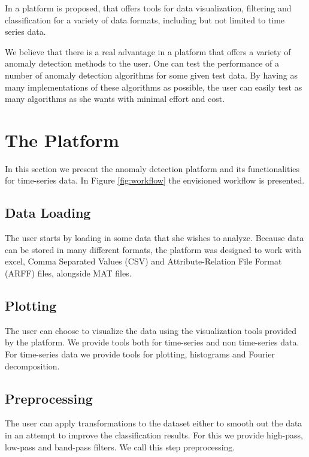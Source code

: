 \documentclass[a4paper, 10pt]{article}
\begin{document}
In \cite{tpad2018} a platform is proposed, that offers tools for data visualization, filtering and classification for a variety of data formats, including but not limited to time series data.

We believe that there is a real advantage in a platform that offers a variety of anomaly detection methods to the user. One can test the performance of a number of anomaly detection algorithms for some given test data. By having as many implementations of these algorithms as possible, the user can easily test as many algorithms as she wants with minimal effort and cost.

\section{The Platform \label{platform}}
 
In this section we present the anomaly detection platform and its functionalities for time-series data. In Figure \ref{fig:workflow} the envisioned workflow is presented. 

\subsection{Data Loading}

The user starts by loading in some data that she wishes to analyze. Because data can be stored in many different formats, the platform was designed to work with excel, Comma Separated Values (CSV) and Attribute-Relation File Format (ARFF) files, alongside MAT files. 

\subsection{Plotting}

The user can choose to visualize the data using the visualization tools provided by the platform. We provide tools both for time-series and non time-series data. For time-series data we provide tools for plotting, histograms and Fourier decomposition.

\subsection{Preprocessing}

The user can apply transformations to the dataset either to smooth out the data in an attempt to improve the classification results. For this we provide high-pass, low-pass and band-pass filters. We call this step preprocessing.
\end{document}
